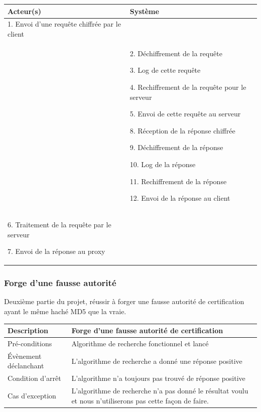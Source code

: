 \documentclass[a4paper,11pt,french]{article}
\begin{document}
\begin{tabular}{|m{8cm}|m{8cm}|}
   \hline
  \rowcolor[gray]{.8} Acteur(s) & Système \\
   \hline
   1. Envoi d'une requête chiffrée par le client & \\
   \hline
    &
2. Déchiffrement de la requête

3. Log de cette requête

4. Rechiffrement de la requête pour le serveur

5. Envoi de cette requête au serveur


8. Réception de la réponse chiffrée

9. Déchiffrement de la réponse

10. Log de la réponse

11. Rechiffrement de la réponse

12. Envoi de la réponse au client \\
   \hline
  6. Traitement de la requête par le serveur
  
7. Envoi de la réponse au proxy  &  \\
   \hline
\end{tabular}


\subsubsection{Forge d'une fausse autorité}

Deuxième partie du projet, réussir à forger une fausse autorité de certification ayant le même haché MD5 que la vraie.

\begin{tabular}{|>{\columncolor[gray]{.8}}m{4cm}|m{12cm}|}
   \hline
   Description & Forge d'une fausse autorité de certification \\
   \hline
   Pré-conditions & Algorithme de recherche fonctionnel et lancé
 \\
   \hline
   Évènement déclanchant & L'algorithme de recherche a donné une réponse positive  \\
   \hline
   Condition d'arrêt & L'algorithme n'a toujours pas trouvé de réponse positive \\
   \hline
   Cas d'exception  &  L'algorithme de recherche n'a pas donné le résultat voulu et nous n'utiliserons pas cette  façon de faire. \\
   \hline   
\end{tabular}

~\\
\end{document}
